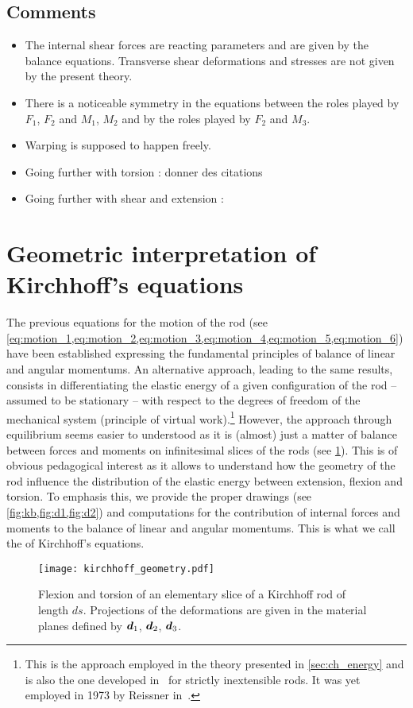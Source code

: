 \subsection{Comments}

\begin{itemize}
\item 
The internal shear forces are reacting parameters and are given by the balance equations. Transverse shear deformations and stresses are not given by the present theory.
\item
There is a noticeable symmetry in the equations between the roles played by $F_1$, $F_2$ and $M_1$, $M_2$ and by the roles played by $F_2$ and $M_3$.
\item
Warping is supposed to happen freely.
\item
Going further with torsion : donner des citations
\item
Going further with shear and extension : \cite{Reissner1973}
\end{itemize}



\clearpage
\makebox[\textwidth]{} %
\newpage
\section{Geometric interpretation of Kirchhoff's equations}

The previous equations for the motion of the rod (see \cref{eq:motion_1,eq:motion_2,eq:motion_3,eq:motion_4,eq:motion_5,eq:motion_6}) have been established expressing the fundamental principles of balance of linear and angular momentums. An alternative approach, leading to the same results, consists in differentiating the elastic energy of a given configuration of the rod -- assumed to be stationary -- with respect to the degrees of freedom of the mechanical system (principle of virtual work).\footnote{This is the approach employed in the theory presented in \cref{sec:ch_energy} and is also the one developed in~\cite{Audoly2010} for strictly inextensible rods. It was yet employed in 1973 by Reissner in~\cite{Reissner1973}.} However, the approach through equilibrium seems easier to understood as it is (almost) just a matter of balance between forces and moments on infinitesimal slices of the rods (see \cref{fig:slice}). This is of obvious pedagogical interest as it allows to understand how the geometry of the rod influence the distribution of the elastic energy between extension, flexion and torsion. To emphasis this, we provide the proper drawings (see \cref{fig:kb,fig:d1,fig:d2}) and computations for the contribution of internal forces and moments to the balance of linear and angular momentums. This is what we call the  of Kirchhoff's equations.
\begin{figure}[h]
	\centering
	\texttt{[image: kirchhoff\_geometry.pdf]}
	\caption{Flexion and torsion of an elementary slice of a Kirchhoff rod of length $ds$. Projections of the deformations are given in the material planes defined by $\boldsymbol{d}_1$, $\boldsymbol{d}_2$, $\boldsymbol{d}_3$.}
	\label{fig:slice}
\end{figure} 

